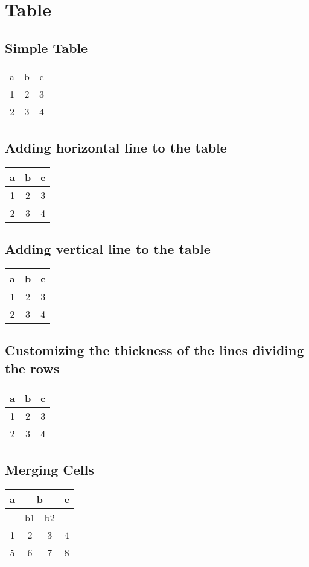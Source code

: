\section{Table}

\subsection{Simple Table}

\begin{tabular}{ccc}
a & b & c \\
1 & 2 & 3 \\
2 & 3 & 4
\end{tabular}

\subsection{Adding horizontal line to the table}
\begin{tabular}{ccc}
\hline
a & b & c \\
\hline
1 & 2 & 3 \\
2 & 3 & 4\\
\hline
\end{tabular}


\subsection{Adding vertical line to the table}
\begin{tabular}{|c|c|c|}
\hline
a & b & c \\
\hline
1 & 2 & 3 \\
2 & 3 & 4\\
\hline
\end{tabular}

\subsection{Customizing the thickness of the lines dividing the rows}
\begin{tabular}{ccc}
\toprule[1.5pt]
a & b & c \\
\midrule[1.0pt]
1 & 2 & 3 \\
2 & 3 & 4\\
\bottomrule[1.5pt]
\end{tabular}

\subsection{Merging Cells}
\begin{tabular}{cccc}
\hline
a & \multicolumn{2}{c}{b} & c\\
\hline
 & b1 & b2 & \\
\hline
1 & 2 & 3 & 4 \\
5 & 6 & 7 & 8 \\
\end{tabular}





